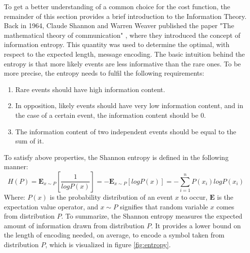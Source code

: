 To get a better understanding of a common choice for the cost function, the remainder of this section provides a brief introduction to the Information Theory.
Back in 1964, Claude Shannon and Warren Weaver published the paper "The mathematical theory of communication" \cite{Shannon}, where they introduced the concept of information entropy. This quantity was used to determine the optimal, with respect to the expected length,  message encoding. The basic intuition behind the entropy is that more likely events are less informative than the rare ones. To be more precise, the entropy needs to fulfil the following requirements:
\begin{enumerate}
\item Rare events should have high information content. 
\item In opposition, likely events should have very low information content, and in the case of a certain event, the information content should be $0$. 
\item The information content of two independent events should be equal to the sum of it. 
\end{enumerate}
To satisfy above properties, the Shannon entropy is defined in the following manner:  
\begin{equation}\label{eq:entropy}
H(P) =\mathbf{E}_{x\sim P}\left[\frac{1}{log P(x)} \right] = - \mathbf{E}_{x\sim P}[log P(x)] = - \sum_{i=1}^{n} P(x_i)log P(x_i)
\end{equation}
Where: $P(x)$ is the probability distribution of an event $x$ to occur, $\mathbf{E}$ is the expectation value operator, and $x \sim P$ signifies that random variable $x$ comes from distribution $P$. To summarize, the Shannon entropy measures the expected amount of information drawn from distribution $P$. It provides a lower bound on the length of encoding needed, on average, to encode a symbol taken from distribution $P$, which is visualized in figure \ref{fig:entropy}.

